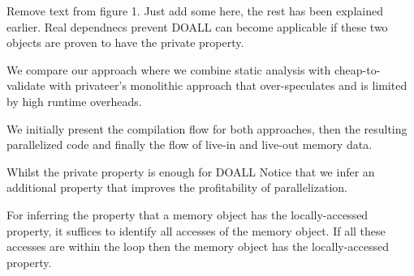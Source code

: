 Remove text from figure 1. Just add some here, the rest has been explained
earlier.
Real dependnecs prevent
DOALL can become applicable if these two objects are proven to have the
private property.

We compare our approach where we combine static analysis with cheap-to-validate
with privateer's monolithic approach that over-speculates and is limited by high
runtime overheads.

We initially present the compilation flow for both approaches, then the
resulting parallelized code and finally the flow of live-in and live-out memory
data.

Whilst the private property is enough for DOALL
Notice that we infer an additional property that improves the profitability
of parallelization.


For inferring the property that a memory object has the locally-accessed
property, it suffices to identify all accesses of the memory object. If all
these accesses are within the loop then the memory object has the
locally-accessed property.


%


